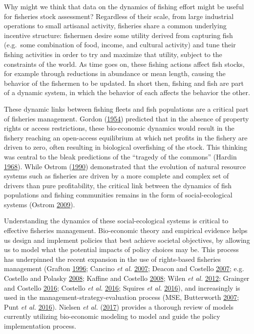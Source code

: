 \documentclass[twoside,12pt,final]{ucthesis-CA2012}
\begin{document}
\begin{ucmainmatter}
Why might we think that data on the dynamics of fishing effort might be
useful for fisheries stock assessment? Regardless of their scale, from
large industrial operations to small artisanal activity, fisheries share
a common underlying incentive structure: fishermen desire some utility
derived from capturing fish (e.g.~some combination of food, income, and
cultural activity) and tune their fishing activities in order to try and
maximize that utility, subject to the constraints of the world. As time
goes on, these fishing actions affect fish stocks, for example through
reductions in abundance or mean length, causing the behavior of the
fishermen to be updated. In short then, fishing and fish are part of a
dynamic system, in which the behavior of each affects the behavior the
other.

These dynamic links between fishing fleets and fish populations are a
critical part of fisheries management. Gordon
(\protect\hyperlink{ref-Gordon1954}{1954}) predicted that in the absence
of property rights or access restrictions, these bio-economic dynamics
would result in the fishery reaching an open-access equilibrium at which
net profits in the fishery are driven to zero, often resulting in
biological overfishing of the stock. This thinking was central to the
bleak predictions of the ``tragedy of the commons'' (Hardin
\protect\hyperlink{ref-Hardin1968}{1968}). While Ostrom
(\protect\hyperlink{ref-Ostrom1990}{1990}) demonstrated that the
evolution of natural resource systems such as fisheries are driven by a
more complete and complex set of drivers than pure profitability, the
critical link between the dynamics of fish populations and fishing
communities remains in the form of social-ecological systems (Ostrom
\protect\hyperlink{ref-Ostrom2009}{2009}).

Understanding the dynamics of these social-ecological systems is
critical to effective fisheries management. Bio-economic theory and
empirical evidence helps us design and implement policies that best
achieve societal objectives, by allowing us to model what the potential
impacts of policy choices may be. This process has underpinned the
recent expansion in the use of rights-based fisheries management
(Grafton \protect\hyperlink{ref-Grafton1996}{1996}; Cancino \emph{et
al.} \protect\hyperlink{ref-Cancino2007}{2007}; Deacon and Costello
\protect\hyperlink{ref-Deacon2007}{2007}; e.g. Costello and Polasky
\protect\hyperlink{ref-Costello2008}{2008}; Kaffine and Costello
\protect\hyperlink{ref-Kaffine2008}{2008}; Wilen \emph{et al.}
\protect\hyperlink{ref-Wilen2012}{2012}; Grainger and Costello
\protect\hyperlink{ref-Grainger2016}{2016}; Costello \emph{et al.}
\protect\hyperlink{ref-Costello2016}{2016}; Squires \emph{et al.}
\protect\hyperlink{ref-Squires2016}{2016}), and increasingly is used in
the management-strategy-evaluation process (MSE, Butterworth
\protect\hyperlink{ref-Butterworth2007}{2007}; Punt \emph{et al.}
\protect\hyperlink{ref-Punt2016a}{2016}). Nielsen \emph{et al.}
(\protect\hyperlink{ref-Nielsen2017}{2017}) provides a thorough review
of models currently utilizing bio-economic modeling to model and guide
the policy implementation process.


\end{ucmainmatter}
\end{document}
